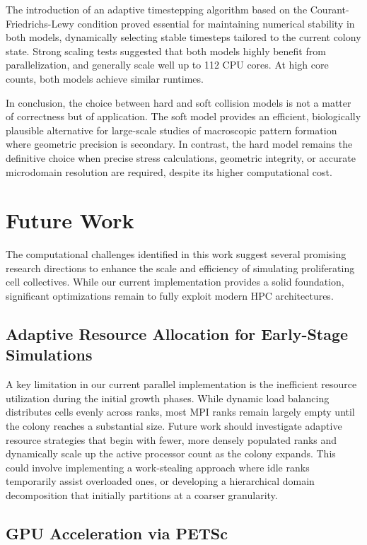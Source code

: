 \documentclass[conference]{IEEEtran}
\begin{document}
The introduction of an adaptive timestepping algorithm based on the Courant-Friedrichs-Lewy condition proved essential for maintaining numerical stability in both models, dynamically selecting stable timesteps tailored to the current colony state. Strong scaling tests suggested that both models highly benefit from parallelization, and generally scale well up to 112 CPU cores. At high core counts, both models achieve similar runtimes.

In conclusion, the choice between hard and soft collision models is not a matter of correctness but of application. The soft model provides an efficient, biologically plausible alternative for large-scale studies of macroscopic pattern formation where geometric precision is secondary. In contrast, the hard model remains the definitive choice when precise stress calculations, geometric integrity, or accurate microdomain resolution are required, despite its higher computational cost.

\section{Future Work}

The computational challenges identified in this work suggest several promising research directions to enhance the scale and efficiency of simulating proliferating cell collectives. While our current implementation provides a solid foundation, significant optimizations remain to fully exploit modern HPC architectures.

\subsection{Adaptive Resource Allocation for Early-Stage Simulations}

A key limitation in our current parallel implementation is the inefficient resource utilization during the initial growth phases. While dynamic load balancing distributes cells evenly across ranks, most MPI ranks remain largely empty until the colony reaches a substantial size. Future work should investigate adaptive resource strategies that begin with fewer, more densely populated ranks and dynamically scale up the active processor count as the colony expands. This could involve implementing a work-stealing approach where idle ranks temporarily assist overloaded ones, or developing a hierarchical domain decomposition that initially partitions at a coarser granularity.

\subsection{GPU Acceleration via PETSc}
\end{document}

